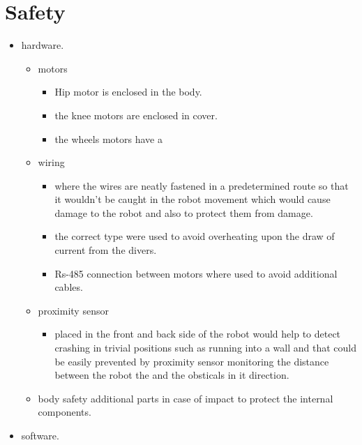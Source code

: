 \chapter{Safety}

\graphicspath{{./Figures/Modeling}}

\begin{itemize}
	\item hardware.
	\begin{itemize}
		\item motors 
			\begin{itemize}
				\item Hip motor is enclosed in the body. 
				\item the knee motors are enclosed in cover.
				\item the wheels motors have a 
			\end{itemize}
		\item wiring 
		\begin{itemize}
			\item where the wires are neatly fastened in a predetermined route so that it wouldn't be caught in the robot movement which would cause damage to the robot and also to protect them from damage.  
			\item the correct type were used to avoid overheating upon the draw of current from the divers.
			\item Rs-485 connection between motors where used to avoid additional cables.
		\end{itemize}
	
		\item proximity sensor
		\begin{itemize}
			\item  placed in the front and back side of the robot would help to detect crashing in trivial positions such as running into a wall and that could be easily prevented by proximity sensor monitoring the distance between the robot the and the obsticals in it direction. 
		\end{itemize}
			
		\item body safety additional parts in case of impact to protect the internal components. 
	\end{itemize}
	\item software.
	
\end{itemize}